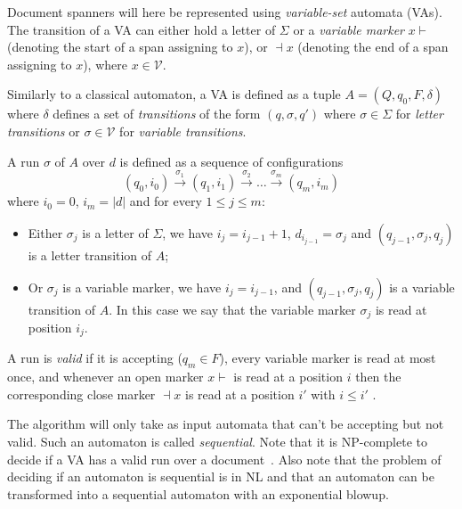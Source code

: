 \documentclass[12px]{article}
\begin{document}
        Document spanners will here be represented using \textit{variable-set}
        automata (VAs). The transition of a VA can either hold a letter of
        $\Sigma$ or a \textit{variable marker} $x \vdash$ (denoting the
        start of a span assigning to $x$), or $\dashv x$ (denoting the end of
        a span assigning to $x$), where $x \in \mathcal{V}$.

        Similarly to a classical automaton, a VA is defined as a tuple $A = (Q,
        q_0, F, \delta)$ where $\delta$ defines a set of \textit{transitions}
        of the form $(q, \sigma, q')$ where $\sigma \in \Sigma$ for
        \textit{letter transitions} or $\sigma \in \mathcal{V}$ for
        \textit{variable transitions}.

        A run $\sigma$ of $A$ over $d$ is defined as a sequence of
        configurations
          \[ (q_0, i_0) \xrightarrow{\sigma_1} (q_1, i_1)
          \xrightarrow{\sigma_2} \ldots \xrightarrow{\sigma_m} (q_m, i_m) \]
        where $i_0 = 0$, $i_m = |d|$ and for every $1 \leq j \leq m$:
        \begin{itemize}
          \item Either $\sigma_j$ is a letter of $\Sigma$, we have $i_j =
            i_{j-1} + 1$, $d_{i_{j-1}} = \sigma_j$ and $(q_{j-1}, \sigma_j,
            q_j)$ is a letter transition of $A$;
          \item Or $\sigma_j$ is a variable marker, we have $i_j = i_{j-1}$,
            and $(q_{j-1}, \sigma_j, q_j)$ is a variable transition of $A$. In
            this case we say that the variable marker $\sigma_j$ is read at
            position $i_j$.
        \end{itemize}

        A run is \textit{valid} if it is accepting ($q_m \in F$), every
        variable marker is read at most once, and whenever an open marker $x
        \vdash$ is read at a position $i$ then the corresponding close marker
        $\dashv x$ is read at a position $i'$ with $i \leq i'$ .

        The algorithm will only take as input automata that can't be accepting
        but not valid. Such an automaton is called \textit{sequential}. Note
        that it is NP-complete to decide if a VA has a valid run over a
        document~\cite{freydenberger:LIPIcs:2017}. Also note that the problem
        of deciding if an automaton is sequential is in NL and that an
        automaton can be transformed into a sequential automaton with an
        exponential blowup.
\end{document}
